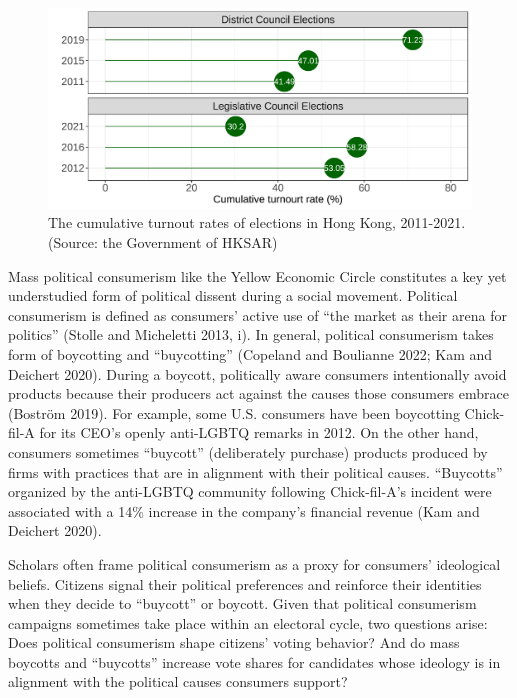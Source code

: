\documentclass[letterpaper, 12pt]{article}
\begin{document}
\begin{figure}[h!]
\begin{center}
        \includegraphics[scale=0.7]{Visuals/trend_turnouts.pdf} 
        \caption{The cumulative turnout rates of elections in Hong Kong, 2011-2021. (Source: the Government of HKSAR)}
        \label{fig: turnouts_trend}
\end{center}
\end{figure}

Mass political consumerism like the Yellow Economic Circle constitutes a key yet understudied form of political dissent during a social movement. Political consumerism is defined as consumers' active use of ``the market as their arena for politics'' (Stolle and Micheletti 2013, \mbox{i}). In general, political consumerism takes form of boycotting and ``buycotting'' (Copeland and Boulianne 2022; Kam and Deichert 2020). During a boycott, politically aware consumers intentionally avoid products because their producers act against the causes those consumers embrace (Bostr{\"o}m 2019). For example, some U.S. consumers have been boycotting Chick-fil-A for its CEO's openly anti-LGBTQ remarks in 2012. On the other hand, consumers sometimes ``buycott'' (deliberately purchase) products produced by firms with practices that are in alignment with their political causes. ``Buycotts'' organized by the anti-LGBTQ community following Chick-fil-A's incident were associated with a 14\% increase in the company's financial revenue (Kam and Deichert 2020). 

Scholars often frame political consumerism as a proxy for consumers' ideological beliefs. Citizens signal their political preferences and reinforce their identities when they decide to ``buycott'' or boycott. Given that political consumerism campaigns sometimes take place within an electoral cycle, two questions arise: Does political consumerism shape citizens' voting behavior? And do mass boycotts and ``buycotts'' increase vote shares for candidates whose ideology is in alignment with the political causes consumers support? 
\end{document}
